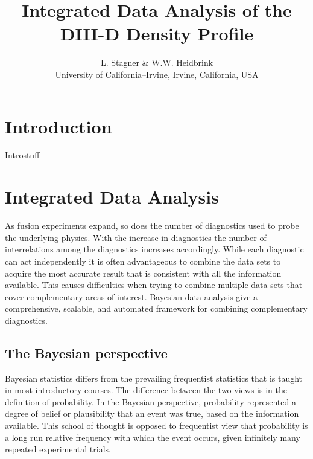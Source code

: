 \documentclass	[12pt]{article}
\begin{document}
\title{\bf{Integrated Data Analysis of the DIII-D Density Profile}}
\author{L. Stagner \& W.W. Heidbrink \\ University of California--Irvine, Irvine, California, USA}
\date{}
\maketitle
\begin{abstract}
\end{abstract}
\section{Introduction}
Introstuff

\section{Integrated Data Analysis}
As fusion experiments expand, so does the number of diagnostics used to probe the underlying physics. With the increase in diagnostics the number of interrelations among the diagnostics increases accordingly. While each diagnostic can act independently it is often advantageous to combine the data sets to acquire the most accurate result that is consistent with all the information available. This causes difficulties when trying to combine multiple data sets that cover complementary areas of interest. Bayesian data analysis give a comprehensive, scalable, and automated framework for combining complementary diagnostics.    
\subsection{The Bayesian perspective}
Bayesian statistics differs from the prevailing frequentist statistics that is taught in most introductory courses. The difference between the two views is in the definition of probability. In the Bayesian perspective, probability represented a degree of belief or plausibility that an event was true, based on the information available. This school of thought is opposed to frequentist view that probability is a long run relative frequency with which the event occurs, given infinitely many repeated experimental trials.\cite{von2011bayesian}
\end{document}
